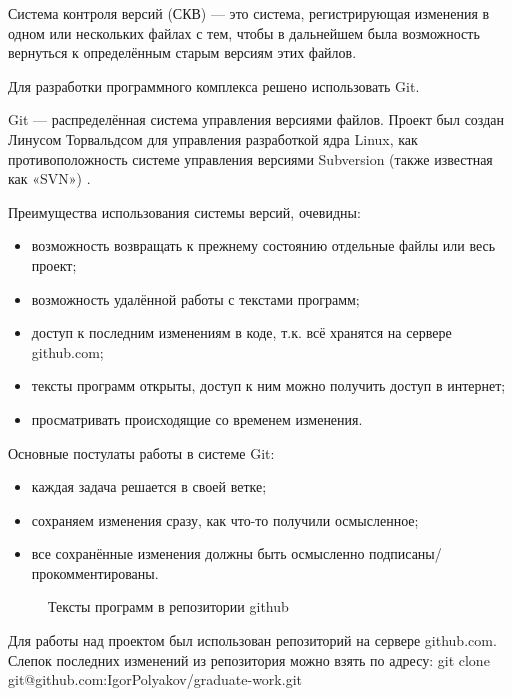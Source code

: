 Система контроля версий (СКВ) — это система, регистрирующая изменения в одном или нескольких файлах с тем, чтобы в дальнейшем была возможность вернуться к определённым старым версиям этих файлов.

Для разработки программного комплекса решено использовать Git.

Git  — распределённая система управления версиями файлов. Проект был создан Линусом Торвальдсом для управления разработкой ядра Linux, как противоположность системе управления версиями Subversion (также известная как «SVN») \cite{progit}.

Преимущества использования системы версий, очевидны:
\begin{itemize}
\item возможность возвращать к прежнему состоянию отдельные файлы или весь проект;
\item возможность удалённой работы с текстами программ;
\item доступ к последним изменениям в коде, т.к. всё хранятся на сервере github.com;
\item тексты программ открыты, доступ к ним можно получить доступ в интернет;
\item просматривать происходящие со временем изменения.
\end{itemize}

Основные постулаты работы в системе Git:
\begin{itemize}
\item каждая задача решается в своей ветке;
\item сохраняем изменения сразу, как что-то получили осмысленное;
\item все сохранённые изменения должны быть осмысленно подписаны/прокомментированы.
\end{itemize}
\begin{figure}[ht]
\caption{Тексты программ в репозитории github}
\label{pic:github}
\end{figure}

Для работы над проектом был использован репозиторий на сервере github.com. Слепок последних изменений из репозитория можно взять по адресу: git clone git@github.com:IgorPolyakov/graduate-work.git

